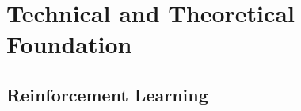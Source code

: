 
%
%

\chapter{Technical and Theoretical Foundation}
\label{chap.grundlagen}
\section{Reinforcement Learning}\label{reinforcementlearning}
